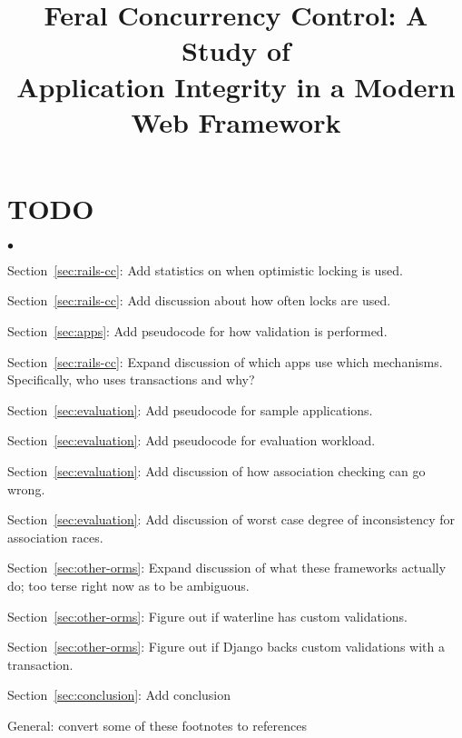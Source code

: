 \documentclass{sig-alternate}
\theoremstyle{definition}
\newenvironment{myitemize}
{
  \vspace{-.4em}
    \begin{list}{$\bullet$ }{}
        \setlength{\topsep}{0em}
        \setlength{\parskip}{0pt}
        \setlength{\partopsep}{0pt}
        \setlength{\parsep}{0pt}         
        \setlength{\itemsep}{.25em} 
        \setlength{\itemindent}{0em}
}
{
    \end{list} 
    \vspace{-.4em}
}
\begin{document}
%

\title{Feral Concurrency Control: A Study of\\Application Integrity in
  a Modern Web Framework}

{\author{}}
\maketitle

\section*{TODO}
\begin{myitemize}
\item Section~\ref{sec:rails-cc}: Add statistics on when optimistic
  locking is used.
\item Section~\ref{sec:rails-cc}: Add discussion about how often locks
  are used.
\item Section~\ref{sec:apps}: Add pseudocode for how validation is performed.
\item Section~\ref{sec:rails-cc}: Expand discussion of which apps use
  which mechanisms. Specifically, who uses transactions and why?
\item Section~\ref{sec:evaluation}: Add pseudocode for sample applications.
\item Section~\ref{sec:evaluation}: Add pseudocode for evaluation
  workload.
\item Section~\ref{sec:evaluation}: Add discussion of how association
  checking can go wrong.
\item Section~\ref{sec:evaluation}: Add discussion of worst case
  degree of inconsistency for association races.
\item Section~\ref{sec:other-orms}: Expand discussion of what these
  frameworks actually do; too terse right now as to be ambiguous.
\item Section~\ref{sec:other-orms}: Figure out if waterline has custom
  validations.
\item Section~\ref{sec:other-orms}: Figure out if Django backs custom
  validations with a transaction.
\item Section~\ref{sec:conclusion}: Add conclusion
\item General: convert some of these footnotes to references
\end{myitemize}





















 



\balance
\end{document}
